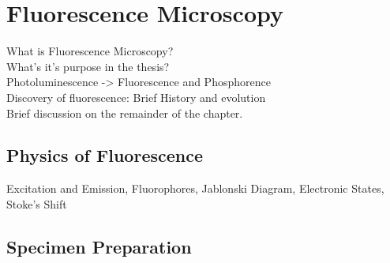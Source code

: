 
\chapter{Fluorescence Microscopy} %

\label{chap:Chapter2} %

\citep{SpringDavisdson2016,Rice2016}
\citep{Rice2016}
\citep{Nobel2016}
\citep{AbramowitzDavidson2016}
\citep{ThermoFisher2016}
\citep{LichtmanConchello2005}
\citep{Spring2003}
\citep{Biehlmaier2013}
\citep{Svoboda2007}
\citep{Svoboda2009}
\citep{WuMerchantCastleman2008}
\citep{GonzalezWoods2002}
\citep{Pratt2001}
\citep{Soile2004}
\citep{Murphy2001}
\citep{Matula2006}
\citep{Rohr2010}
\citep{Matula2000}
\citep{Sarder2006}
\citep{Vu2008}
\citep{Kolmogorov2004}
\citep{Hubeny2008}
\citep{Kozubek2001}
\citep{Petran1985}
\citep{Tsien1998}

What is Fluorescence Microscopy?\\
What's it's purpose in the thesis?\\
Photoluminescence -> Fluorescence and Phosphorence\\
Discovery of fluorescence: Brief History and evolution\\
Brief discussion on the remainder of the chapter.


\section{Physics of Fluorescence}
\label{sec:PhysicsOfFluorescence}

Excitation and Emission, Fluorophores, Jablonski Diagram, Electronic States, Stoke's Shift


\section{Specimen Preparation}
\label{sec:SpecimenPreparation}

